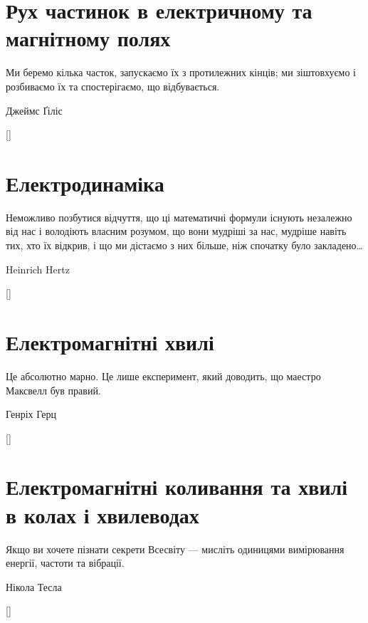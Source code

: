 \documentclass[biblatex]{ConspectBook}
\begin{document}
\part{Рух частинок в електричному та магнітному полях}
\label{part:ChargedParticleMotion}
\epigraph{Ми беремо кілька часток, запускаємо їх з протилежних кінців; ми зіштовхуємо і розбиваємо їх та спостерігаємо, що відбувається.}{Джеймс Ґіліс}
[]

\part{Електродинаміка}
\label{part:Electrodynamics}
\epigraph{Неможливо позбутися відчуття, що ці математичні формули існують незалежно від нас і володіють власним розумом, що вони мудріші за нас, мудріше навіть тих, хто їх відкрив, і що ми дістаємо з них більше, ніж спочатку було закладено\ldots}{Heinrich Hertz}
[]

\part{Електромагнітні хвилі}
\label{part:ElectromagneticWaves}
\epigraph{Це абсолютно марно. Це лише експеримент, який доводить, що маестро Максвелл був правий.}{Генріх Герц}
[]

\part{Електромагнітні коливання та хвилі в колах і хвилеводах}
\label{part:EMOscillationsAndWaveguides}
\epigraph{Якщо ви хочете пізнати секрети Всесвіту --- мисліть одиницями вимірювання енергії, частоти та вібрації.}{Нікола Тесла}
[]

%
%
%
%
\appendix


%
%
\clearpage\bibliographytrue{}\label{BibPage}
\pagestyle{bibliography}

\nocite{%
	ZhdanovElectro1,
	ZhdanovElectro2,
	ParnovskyElectro,
	Ponomarenko,
    FLP2,
    Fedorchenko1992,
    Suhakov1975,
    purcell2013electricity,
}

\printbibliography[heading=bibintoc]

\makelastpage
\end{document}
